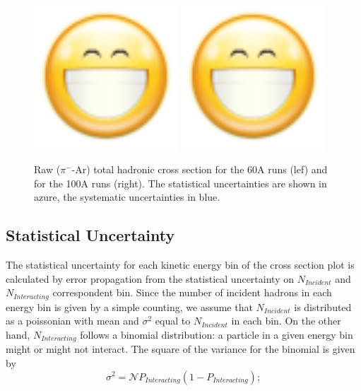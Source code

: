 \begin{figure}
\centering  
\includegraphics[width=0.48\textwidth]{Chapter-4/Images/face-smile-big.png}
\includegraphics[width=0.48\textwidth]{Chapter-4/Images/face-smile-big.png}
\caption{Raw ($\pi^-$-Ar) total hadronic cross section for the 60A runs (lef) and for the 100A runs (right). The statistical uncertainties are shown in azure, the systematic uncertainties in blue.}
\label{fig:XSRaw}
\end{figure}


\subsection{Statistical Uncertainty}\label{ch:StatUncertaintyXSRaw}
The statistical uncertainty for each kinetic energy bin of the cross section plot is calculated by error propagation from the statistical uncertainty on $N_{Incident}$ and $N_{Interacting}$ correspondent bin.  Since the number of incident hadrons in each energy bin is given by a simple counting, we assume that $N_{Incident}$ is distributed as a poissonian with mean and $\sigma^2$ equal to $N_{Incident}$ in each bin.  
On the other hand, $N_{Interacting}$ follows a binomial distribution: a particle in a given energy bin might or might not interact.  The square of the variance for the binomial is given by  
\begin{equation}
\sigma^2 = \mathcal{N}P_{Interacting}(1-P_{Interacting});
\label{eq:binVar}
\end{equation}

